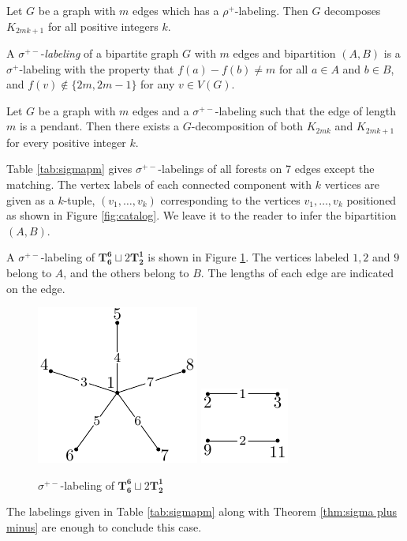 \begin{thm} \label{thm:rho plus}
Let $G$ be a graph with $m$ edges which has a $\rho^+$-labeling. Then $G$ decomposes $K_{2mk+1}$ for all positive integers $k$.
\end{thm}

\begin{definition} \label{def:sigma plus minus} 
A $\sigma^{+-}$-\emph{labeling} of a bipartite graph $G$ with $m$ edges and bipartition $(A,B)$ is a $\sigma^+$-labeling with the property that $f(a) - f(b) \neq m$ for all $a \in A$ and $b \in B$, and $f(v) \not\in \{2m,2m-1\}$ for any $v\in V(G)$.
\end{definition}

\begin{thm} \label{thm:sigma plus minus}
Let $G$ be a graph with $m$ edges and a $\sigma^{+-}$-labeling such that the edge of length $m$ is a pendant. Then there exists a $G$-decomposition of both $K_{2mk}$ and $K_{2mk+1}$ for every positive integer $k$.
\end{thm}

Table \ref{tab:sigmapm} gives $\sigma^{+-}$-labelings of all forests on 7 edges except the matching. The vertex labels of each connected component with $k$ vertices are given as a $k$-tuple, $(v_1,\dots ,v_k)$ corresponding to the vertices $v_1, \dots, v_k$ positioned as shown in Figure \ref{fig:catalog}. We leave it to the reader to infer the bipartition $(A,B)$. 
\begin{example}
    A $\sigma^{+-}$-labeling of $\mathbf{T_{6}^{6}}\sqcup 2\mathbf{T_{2}^{1}}$ is shown in Figure \ref{fig:sigma label ex}. The vertices labeled $1,2$ and $9$ belong to $A$, and the others belong to $B$. The lengths of each edge are indicated on the edge.
    \begin{figure}[H]
        \centering
        \includegraphics[scale=1.0]{standalone/sigma label ex1.pdf}
         \includegraphics[scale=1.0]{standalone/sigma label ex2.pdf}
        \caption{$\sigma^{+-}$-labeling of $\mathbf{T_{6}^{6}}\sqcup 2\mathbf{T_{2}^{1}}$}
        \label{fig:sigma label ex}
    \end{figure}
\end{example}
\newpage
 The labelings given in Table \ref{tab:sigmapm} along with Theorem \ref{thm:sigma plus minus} are enough to conclude this case.

